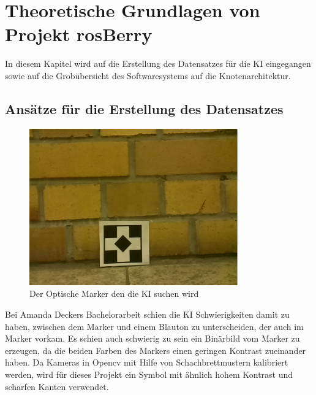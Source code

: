 \documentclass[conference]{IEEEtran}
\begin{document}
	\section{Theoretische Grundlagen von Projekt rosBerry}
	In diesem Kapitel wird auf die Erstellung des Datensatzes für die KI eingegangen sowie auf die Grobübersicht des Softwaresystems auf die Knotenarchitektur. %
	
	\subsection{Ansätze für die Erstellung des Datensatzes}	%
	\begin{figure} [!h]
		\centering
		\includegraphics[width=9cm]{img/data1455211246.png}
		\caption{Der Optische Marker den die KI suchen wird }
		\label{Marker}
	\end{figure}
	
	Bei Amanda Deckers Bachelorarbeit schien die KI Schwierigkeiten damit zu haben, zwischen dem Marker und einem Blauton zu unterscheiden, der auch im Marker vorkam.
	Es schien auch schwierig zu sein ein Binärbild vom Marker zu erzeugen, da die beiden Farben des Markers einen geringen Kontrast zueinander haben.
	Da Kameras in Opencv mit Hilfe von Schachbrettmustern kalibriert werden, wird für dieses Projekt ein Symbol mit ähnlich hohem Kontrast und scharfen Kanten verwendet.
	\\
	
\end{document}
